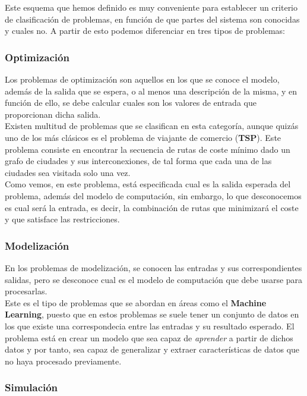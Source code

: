 Este esquema que hemos definido es muy conveniente para establecer un criterio de clasificación de problemas, en función de que partes del sistema son conocidas y cuales no. A partir de esto podemos diferenciar en tres tipos de problemas:

\subsubsection{Optimización}
Los problemas de optimización son aquellos en los que se conoce el modelo, además de la salida que se espera, o al menos una descripción de la misma, y en función de ello, se debe calcular cuales son los valores de entrada que proporcionan dicha salida. \\

Existen multitud de problemas que se clasifican en esta categoría, aunque quizás uno de los más clásicos es el problema de viajante de comercio (\textbf{TSP}). Este problema consiste en encontrar la secuencia de rutas de coste mínimo dado un grafo de ciudades y sus interconexiones, de tal forma que cada una de las ciudades sea visitada solo una vez.\\

Como vemos, en este problema, está especificada cual es la salida esperada del problema, además del modelo de computación, sin embargo, lo que desconocemos es cual será la entrada, es decir, la combinación de rutas que minimizará el coste y que satisface las restricciones.

\subsubsection{Modelización}

En los problemas de modelización, se conocen las entradas y sus correspondientes salidas, pero se desconoce cual es el modelo de computación que debe usarse para procesarlas. \\


Este es el tipo de problemas que se abordan en áreas como el \textbf{Machine Learning}, puesto que en estos problemas se suele tener un conjunto de datos en los que existe una correspondecia entre las entradas y su resultado esperado. El problema está en crear un modelo que sea capaz de \textit{aprender} a partir de dichos datos y por tanto, sea capaz de generalizar y extraer características de datos que no haya procesado previamente.

\subsubsection{Simulación}

